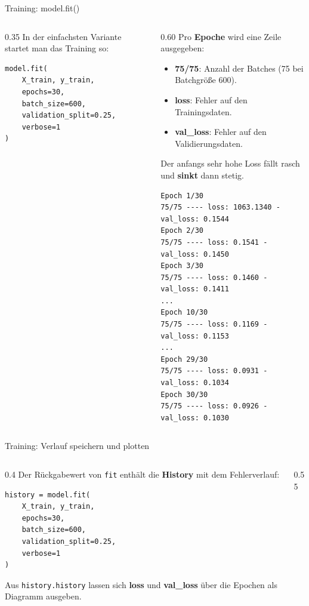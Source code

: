 \begin{frame}[fragile]{Training: model.fit()}
\footnotesize
\begin{columns}
\begin{column}{0.35\textwidth}
In der einfachsten Variante startet man das Training so:
\begin{verbatim}
model.fit(
    X_train, y_train,
    epochs=30,
    batch_size=600,
    validation_split=0.25,
    verbose=1
)
\end{verbatim}

\end{column}
\begin{column}{0.60\textwidth}
\footnotesize
Pro \textbf{Epoche} wird eine Zeile ausgegeben:
\begin{itemize}
\item \textbf{75/75}: Anzahl der Batches (75 bei Batchgröße 600).
\item \textbf{loss}: Fehler auf den Trainingsdaten.
\item \textbf{val\_loss}: Fehler auf den Validierungsdaten.
\end{itemize}
Der anfangs sehr hohe Loss fällt rasch und \textbf{sinkt} dann stetig.

\begin{verbatim}
Epoch 1/30
75/75 ---- loss: 1063.1340 - val_loss: 0.1544
Epoch 2/30
75/75 ---- loss: 0.1541 - val_loss: 0.1450
Epoch 3/30
75/75 ---- loss: 0.1460 - val_loss: 0.1411
...
Epoch 10/30
75/75 ---- loss: 0.1169 - val_loss: 0.1153
...
Epoch 29/30
75/75 ---- loss: 0.0931 - val_loss: 0.1034
Epoch 30/30
75/75 ---- loss: 0.0926 - val_loss: 0.1030
\end{verbatim}


\end{column}
\end{columns}
\end{frame}

\begin{frame}[fragile]{Training: Verlauf speichern und plotten}
\footnotesize
\begin{columns}
\begin{column}{0.4\textwidth}
Der Rückgabewert von \texttt{fit} enthält die \textbf{History} mit dem Fehlerverlauf:
\begin{verbatim}
history = model.fit(
    X_train, y_train,
    epochs=30,
    batch_size=600,
    validation_split=0.25,
    verbose=1
)
\end{verbatim}
Aus \texttt{history.history} lassen sich \textbf{loss} und \textbf{val\_loss} über die Epochen als Diagramm ausgeben.
\end{column}
\begin{column}{0.55\textwidth}
\centering

\end{column}
\end{columns}
\end{frame}

